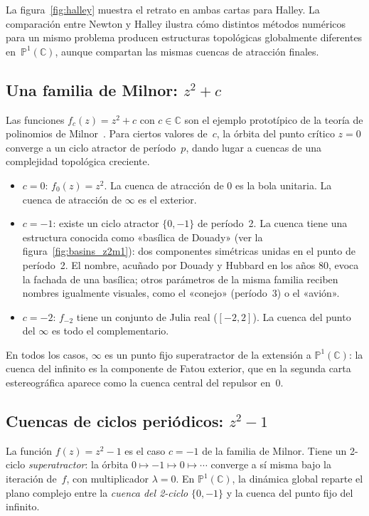 \documentclass[11pt,a4paper]{article}
\theoremstyle{plain}
\theoremstyle{definition}
\theoremstyle{remark}
\newcommand{\C}{\mathbb{C}}
\newcommand{\Puno}{\mathbb{P}^1(\mathbb{C})}
\begin{document}
La figura~\ref{fig:halley} muestra el retrato en ambas cartas para Halley.
La comparación entre Newton y Halley ilustra cómo distintos métodos
numéricos para un mismo problema producen estructuras topológicas
globalmente diferentes en~$\Puno$, aunque compartan las mismas
cuencas de atracción finales.

\subsection{Una familia de Milnor: \texorpdfstring{$z^2+c$}{z2+c}}

Las funciones $f_c(z)=z^2+c$ con $c\in\C$ son el ejemplo prototípico
de la teoría de polinomios de Milnor~\cite{Milnor2006}.
Para ciertos valores de~$c$, la órbita del punto crítico $z=0$ converge
a un ciclo atractor de período~$p$, dando lugar a cuencas de una
complejidad topológica creciente.

\begin{itemize}
  \item $c=0$: $f_0(z)=z^2$. La cuenca de atracción de $0$ es la bola
        unitaria. La cuenca de atracción de $\infty$ es el exterior.
  \item $c=-1$: existe un ciclo atractor $\{0,-1\}$ de período~2.
        La cuenca tiene una estructura conocida como «basílica de Douady» (ver la figura~\ref{fig:basins_z2m1}): dos componentes simétricas unidas en el punto de período~2. El nombre, acuñado por Douady y Hubbard en los años 80, evoca la fachada de una basílica; otros parámetros de la misma familia reciben nombres igualmente visuales, como el «conejo» (período~3) o el «avión».
  \item $c=-2$: $f_{-2}$ tiene un conjunto de Julia real ($[-2,2]$). La cuenca del punto del 
      $\infty$ es todo el complementario.
\end{itemize}

En todos los casos, $\infty$ es un punto fijo superatractor de la
extensión a $\Puno$: la cuenca del infinito es la componente de Fatou
exterior, que en la segunda carta estereográfica aparece como la cuenca
central del repulsor en~$0$.

\subsection{Cuencas de ciclos periódicos: \texorpdfstring{$z^2-1$}{z2-1}}
\label{ssec:pcycle_z2}

La función $f(z)=z^2-1$ es el caso $c=-1$ de la familia de Milnor.
Tiene un 2-ciclo \emph{superatractor}: la órbita $0\mapsto -1\mapsto 0\mapsto\cdots$
converge a sí misma bajo la iteración de~$f$, con multiplicador $\lambda=0$.
En $\Puno$, la dinámica global reparte el plano complejo entre la
\emph{cuenca del 2-ciclo} $\{0,-1\}$ y la cuenca del punto fijo del infinito.
\end{document}
